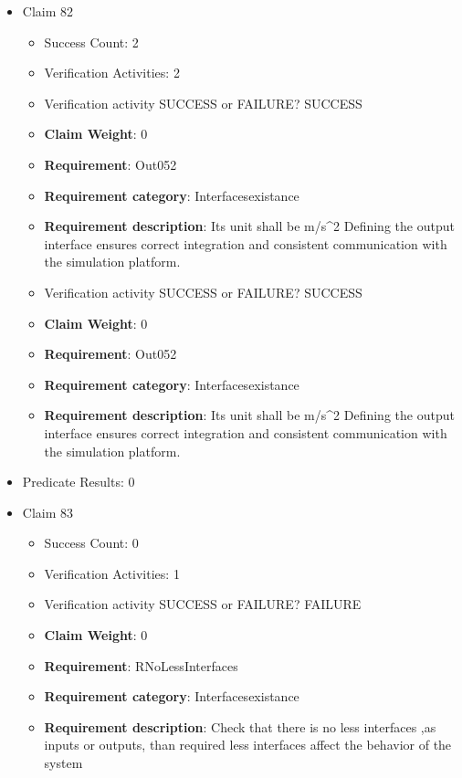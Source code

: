 \documentclass{article}
\begin{document}
\begin{itemize}
  				  \item Claim 82
				\begin{itemize}
			    	\item Success Count: 2 
			    	\item Verification Activities: 2
					\item Verification activity SUCCESS or FAILURE? SUCCESS
					\item \textbf{Claim Weight}: 0
						\item \textbf{Requirement}: Out052 
						\item \textbf{Requirement category}: Interfacesexistance 
						\item \textbf{Requirement description}: Its unit shall be m/s^2 Defining the output interface ensures correct integration and consistent communication with the simulation platform.
					
					\item Verification activity SUCCESS or FAILURE? SUCCESS
					\item \textbf{Claim Weight}: 0
						\item \textbf{Requirement}: Out052 
						\item \textbf{Requirement category}: Interfacesexistance 
						\item \textbf{Requirement description}: Its unit shall be m/s^2 Defining the output interface ensures correct integration and consistent communication with the simulation platform.
					
				\end{itemize}
				
									    
				\item Predicate Results: 0

  				  \item Claim 83
				\begin{itemize}
			    	\item Success Count: 0 
			    	\item Verification Activities: 1
					\item Verification activity SUCCESS or FAILURE? FAILURE
					\item \textbf{Claim Weight}: 0
						\item \textbf{Requirement}: RNoLessInterfaces 
						\item \textbf{Requirement category}: Interfacesexistance 
						\item \textbf{Requirement description}: Check that there is no less interfaces ,as inputs or outputs, than required  less interfaces affect the behavior of the system
					

\end{itemize}
\end{itemize}
\end{document}
